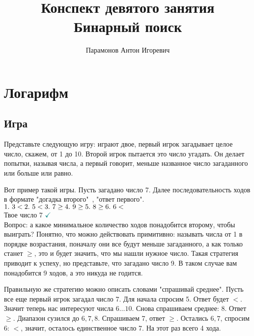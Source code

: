 \documentclass[12pt]{article} %
\begin{document}
\title{Конспект девятого занятия\\
	\large Бинарный поиск}
\author{Парамонов Антон Игоревич}
\maketitle
\section{Логарифм}
\subsection{Игра}
Представьте следующую игру: играют двое, первый игрок загадывает целое число, скажем, от 1 до 10. Второй игрок пытается это число угадать. Он делает попытки, называя числа, а первый говорит, меньше названное число загаданного или больше или равно. 

Вот пример такой игры. Пусть загадано число 7. Далее последовательность ходов в формате "догадка второго"\ , "ответ первого".\\
$1.\ 3 <\\
2.\ 5 <\\
3.\ 7 \geq\\
4.\ 9 \geq\\
5.\ 8 \geq\\
6.\ 6 <$\\
Твое число 7 $\textcolor{teal}{\checkmark}$\\

Вопрос: а какое минимальное количество ходов понадобится второму, чтобы выиграть? Понятно, что можно действовать примитивно: называть числа от 1 в порядке возрастания, поначалу они все будут меньше загаданного, а как только станет $\geq$, это и будет значить, что мы нашли нужное число. Такая стратегия приводит к успеху, но представьте, что загадано число 9. В таком случае вам понадобится 9 ходов, а это никуда не годится.

Правильную же стратегию можно описать словами "спрашивай среднее". Пусть все еще первый игрок загадал число 7. Для начала спросим 5. Ответ будет $<$. Значит теперь нас интересуют числа $6\ldots10$. Снова спрашиваем среднее: 8. Ответ $\geq$. Диапазон сузился до $6, 7, 8$. Спрашиваем 7, ответ $\geq$. Остались $6, 7$, спросим 6: $<$, значит, осталось единственное число 7. На этот раз всего 4 хода. 
\end{document}
